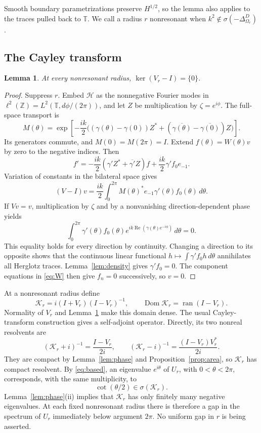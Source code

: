 \documentclass[11pt]{amsart}
\numberwithin{equation}{section}
\newtheorem{lemma}[theorem]{Lemma}
\newcommand{\T}{\mathbb T}
\newcommand{\Hh}{\mathcal H}
\newcommand{\Id}{I}
\newcommand{\Dom}{\operatorname{Dom}}
\newcommand{\ran}{\operatorname{ran}}
\newcommand{\KK}{\mathcal K}
\begin{document}
Smooth boundary parametrizations preserve $H^{1/2}$, so the lemma
also applies to the traces pulled back to $\T$.
We call a radius $r$ nonresonant when
$k^2\notin\sigma(-\Delta_{\Omega_r}^D)$.

\subsection{The Cayley transform}

\begin{lemma}\label{lem:injective}
At every nonresonant radius,
$\ker(V_r-\Id)=\{0\}$.
\end{lemma}

\begin{proof}
Suppress $r$. Embed $\Hh$ as the nonnegative Fourier modes in
$\ell^2(\mathbb Z)=L^2(\T,d\phi/(2\pi))$, and let $Z$ be
multiplication by $\zeta=e^{i\phi}$. The full-space transport is
\[
 M(\theta)=\exp\left[-\frac{ik}{2}
 \big((\gamma(\theta)-\gamma(0))Z^*
 + (\overline{\gamma(\theta)}-\overline{\gamma(0)})Z\big)\right].
\]
Its generators commute, and $M(0)=M(2\pi)=\Id$.
Extend $f(\theta)=W(\theta)v$ by zero to the negative indices.
Then
\[
 f'=-\frac{ik}{2}(\gamma'Z^*+\overline{\gamma'}Z)f
       +\frac{ik}{2}\gamma'f_0e_{-1}.
\]
Variation of constants in the bilateral space gives
\[
 (V-\Id)v=\frac{ik}{2}\int_0^{2\pi}
       M(\theta)^*e_{-1}\gamma'(\theta)f_0(\theta)\,d\theta.
\]
If $Vv=v$, multiplication by $\zeta$ and by a nonvanishing
direction-dependent phase yields
\[
 \int_0^{2\pi}\gamma'(\theta)f_0(\theta)
       e^{ik\operatorname{Re}(\gamma(\theta)e^{-i\phi})}\,d\theta=0.
\]
This equality holds for every direction by continuity.
Changing a direction to its opposite shows that the continuous
linear functional
$h\mapsto\int\gamma'f_0h\,d\theta$ annihilates all Herglotz traces.
Lemma~\ref{lem:density} gives $\gamma'f_0=0$. The component equations
in \eqref{eq:W} then give $f_n=0$ successively, so $v=0$.
\end{proof}

At a nonresonant radius define
\begin{equation}\label{eq:cayley}
 \KK_r=i(\Id+V_r)(\Id-V_r)^{-1},
 \qquad \Dom\KK_r=\ran(\Id-V_r).
\end{equation}
Normality of $V_r$ and Lemma~\ref{lem:injective} make this domain
dense. The usual Cayley-transform construction gives a self-adjoint
operator. Directly, its two nonreal resolvents are
\[
 (\KK_r+i)^{-1}=\frac{\Id-V_r}{2i},\qquad
 (\KK_r-i)^{-1}=\frac{(\Id-V_r)V_r^*}{2i}.
\]
They are compact by Lemma~\ref{lem:phase} and
Proposition~\ref{prop:area}, so $\KK_r$ has compact resolvent.
By \eqref{eq:based}, an eigenvalue $e^{i\theta}$ of $U_r$, with
$0<\theta<2\pi$, corresponds, with the same multiplicity, to
\begin{equation}\label{eq:cot}
 \cot(\theta/2)\in\sigma(\KK_r).
\end{equation}
Lemma~\ref{lem:phase}(ii) implies that $\KK_r$ has only finitely
many negative eigenvalues. At each fixed nonresonant radius there
is therefore a gap in the spectrum of $U_r$ immediately below
argument $2\pi$. No uniform gap in $r$ is being asserted.
\end{document}

